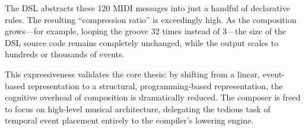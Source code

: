 The DSL abstracts these 120 MIDI messages into just a handful of declarative rules.
The resulting ``compression ratio'' is exceedingly high.
As the composition grows—for example, looping the groove 32 times instead of 3—the size of the DSL source code remains
completely unchanged, while the output scales to hundreds or thousands of events.

This expressiveness validates the core thesis: by shifting from a linear, event-based representation to a structural,
programming-based representation, the cognitive overhead of composition is dramatically reduced.
The composer is freed to focus on high-level musical architecture, delegating the tedious task of temporal event
placement entirely to the compiler's lowering engine.
